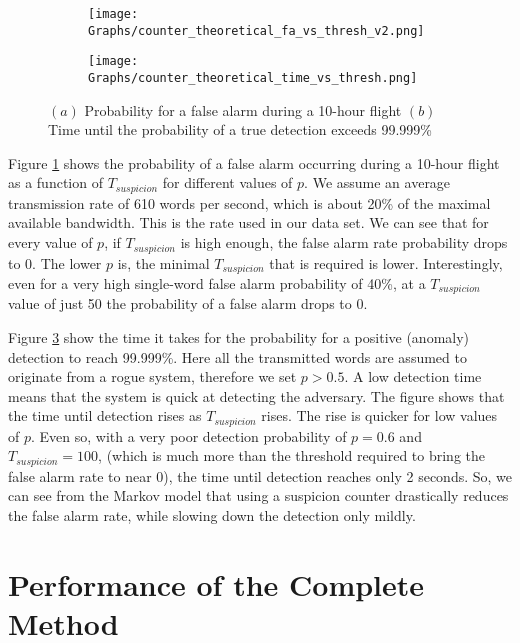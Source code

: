 \documentclass[english]{llncs}
\newcommand{\level}[1]{\section{#1}}
\newcommand{\level}[1]{\chapter{#1}}
\begin{document}
   \begin{figure}[t]
     \centering
    \begin{subfigure}{0.5\linewidth}
      \centering
      \texttt{[image: Graphs/counter\_theoretical\_fa\_vs\_thresh\_v2.png]}
      \caption{}
      \label{fig:CounterTheoreticalFA}
    \end{subfigure}%
    \begin{subfigure}{0.5\linewidth}
      \centering
      \texttt{[image: Graphs/counter\_theoretical\_time\_vs\_thresh.png]}
      \caption{}
      \label{fig:CounterTheoreticalTime}
    \end{subfigure}
    \caption{\((a)\) Probability for a false alarm during a 10-hour flight \((b)\) Time until the probability of a true detection exceeds 99.999\%}
  \end{figure}

  Figure \ref{fig:CounterTheoreticalFA} shows the probability of a false alarm occurring during a 10-hour flight as a function of $T_{suspicion}$ for different values of $p$. We assume an average transmission rate of 610 words per second, which is about 20\% of the maximal available bandwidth. This is the rate used in our data set. We can see that for every value of $p$, if $T_{suspicion}$ is high enough, the false alarm rate probability drops to 0. The lower $p$ is, the minimal $T_{suspicion}$ that is required is lower. Interestingly, even for a very high single-word false alarm probability of 40\%, at a $T_{suspicion}$ value of just 50 the probability of a false alarm drops to 0.
   
  Figure \ref{fig:CounterTheoreticalTime} show the time it takes for the probability for a positive (anomaly) detection to reach 99.999\%. Here all the transmitted words are assumed to originate from a rogue system, therefore we set $p > 0.5$. A low detection time means that the system is quick at detecting the adversary. The figure shows that the time until detection rises as $T_{suspicion}$ rises. The rise is quicker for low values of $p$. Even so, with a very poor detection probability of $p = 0.6$ and $T_{suspicion} = 100$, (which is much more than the threshold required to bring the false alarm rate to near 0), the time until detection reaches only 2 seconds. So, we can see from the Markov model that using a suspicion counter drastically reduces the false alarm rate, while slowing down the detection only mildly.
   
\level{Performance of the Complete Method} \label{PerformanceEvaluationCompleteMethod}
\end{document}
